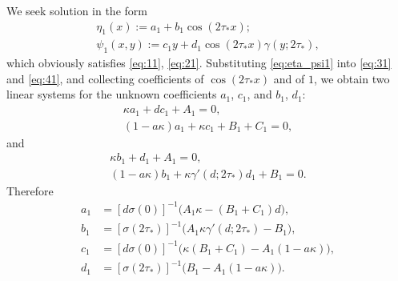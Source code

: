 \documentclass[oneside,a4paper,11pt]{article}
\theoremstyle{thmstyletwo}%
\theoremstyle{thmstylethree}%
\numberwithin{equation}{section}
\def\gamm{\gamma}
\def\taust{\tau_{*}}
\def\Disp{\sigma}
\def\dUd{\kappa}
\def\mddU{a}
\begin{document}
We seek solution in the form
\begin{equation}
\label{eq:eta_psi1}
\begin{gathered}
\eta_1(x):=a_1 + b_1 \cos(2\taust x);\\
\psi_1(x,y):=c_1 y + d_1 \cos(2\taust x) \gamm(y;2\taust),
\end{gathered}
\end{equation}
which obviously satisfies \eqref{eq:11}, \eqref{eq:21}. Substituting \eqref{eq:eta_psi1} into \eqref{eq:31} and  \eqref{eq:41}, and collecting coefficients of $\cos(2\taust x)$ and of $1$, we obtain two linear systems for the unknown coefficients $a_1$, $c_1$, and $b_1$, $d_1$:
\begin{gather*}
\dUd a_1+dc_1+A_1=0,\\
(1-\mddU\dUd)a_1+\dUd c_1+B_1+C_1=0,
\end{gather*}
and
\begin{gather*}
\dUd b_1+d_1+A_1=0,\\
(1-\mddU\dUd)b_1+\dUd\gamm'(d;2\taust)d_1+B_1=0.
\end{gather*}
Therefore
\begin{equation}
\begin{aligned}
a_1&=[d\Disp(0)]^{-1}\bigl(A_1\dUd-(B_1+C_1)d\bigr),\\
b_1&=[\Disp(2\taust)]^{-1}\bigl(A_1\dUd\gamm'(d;2\taust)-B_1\bigr),\\
c_1&=[d\Disp(0)]^{-1}\bigl(\dUd(B_1+C_1)-A_1(1-\mddU\dUd)\bigr),\\
d_1&=[\Disp(2\taust)]^{-1}\bigl(B_1-A_1(1-\mddU\dUd)\bigr).
\end{aligned}\label{eq:abcd1}
\end{equation}
\end{document}
